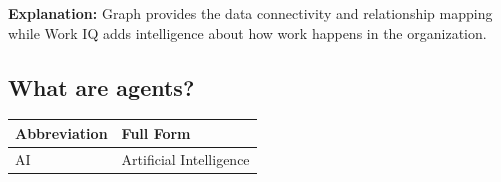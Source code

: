 \documentclass[10pt]{article}
\begin{document}
\begin{enumerate}[leftmargin=*]
\textbf{Explanation:} Graph provides the data connectivity and relationship mapping while Work IQ adds intelligence about how work happens in the organization.

\end{enumerate}
\clearpage

\subsection{What are agents?}

\begin{center}
\begin{tabular}{>{\raggedright\arraybackslash}p{} >{\raggedright\arraybackslash}p{}}
\toprule
\textbf{Abbreviation} & \textbf{Full Form} \\
\midrule
AI & Artificial Intelligence \\
\end{tabular}
\end{center}
\end{document}
